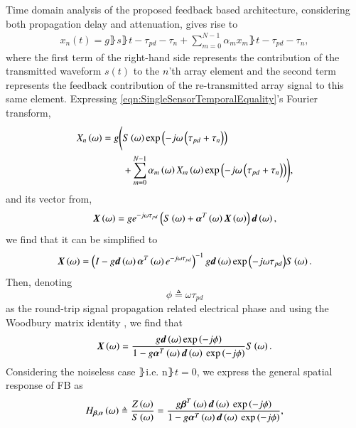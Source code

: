 Time domain analysis of the proposed feedback based architecture, considering both propagation delay and attenuation, gives rise to
\begin{equation}
    \label{eqn:SingleSensorTemporalEquality}
        \begin{split}
            x_{n}(t) = g\rBrace{s\rBrace{t-\tau_{pd}-\tau_{n}}
            +\sum_{m=0}^{N-1}{\alpha_{m}x_{m}\rBrace{t-\tau_{pd}-\tau_{n}}}},
        \end{split}
\end{equation}
where the first term of the right-hand side represents the contribution of the transmitted waveform $s(t)$ to the $n$'th array element and the second term represents the feedback contribution of the re-transmitted array signal to this same element.
Expressing \eqref{eqn:SingleSensorTemporalEquality}'s Fourier transform,
\begin{equation}
    \label{eqn_singleSensorFourier}
        \begin{split}
            \F{x}_{n}\rBrace{\omega} =
            g\Bigg( & \F{s}\rBrace{\omega}
            \exp\rBrace{-j\omega\rBrace{\tau_{pd}+\tau_{n}}}
            \\&+\sum_{m=0}^{N-1}
            {
            \alpha_{m}\rBrace{\omega}\F{x}_{m}\rBrace{\omega}
            \exp\rBrace{-j\omega\rBrace{\tau_{pd}+\tau_{n}}}
            }\Bigg),
        \end{split}
\end{equation}
and its vector from,
$$
\F{\vx}\rBrace{\omega} = ge^{-j\omega\tau_{pd}} \rBrace{\F{s}\rBrace{\omega}+\vAlphaT \F{\vx}\rBrace{\omega}}\vd,
$$
we find that it can be simplified to
$$
\F{\vx}\rBrace{\omega} =\rBrace{I-g\vd\vAlphaT{}e^{-j\omega\tau_{pd}}}^{-1}g\vd\exp{\rBrace{-j\omega\tau_{pd}}}\F{s}\rBrace{\omega}.
$$
Then, denoting
\[
\phi\triangleq\omega\tau_{pd}
\]
as the round-trip signal propagation related electrical phase and using the Woodbury matrix identity \cite{woodbury1950inverting}, we find that
$$
\F{\vx}\rBrace{\omega}
=
\frac{    
g\vd\exp{\rBrace{-j\phi}}
}{
1 - g\aTd{}\exp{\rBrace{-j\phi}}
}\F{s}\rBrace{\omega}.
$$
Considering the noiseless case $\rBrace{\text{i.e. n}\rBrace{t}=0}$,
we express the general spatial response of FB as 
\begin{equation}
\label{eqn:GeneralFeedbackTransferFunction}
\Hba
\triangleq
\frac{\F{z}\rBrace{\omega}}{\F{s}\rBrace{\omega}} 
=
\frac{    
g\bTd{}\exp\rBrace{-j\phi}
}{
1 - g\aTd{}\exp\rBrace{-j\phi}
},
\end{equation}
